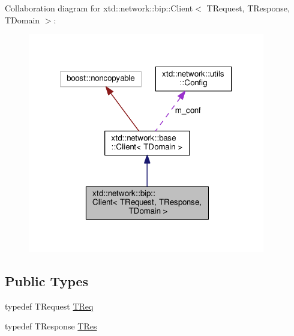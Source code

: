 Collaboration diagram for xtd\-:\-:network\-:\-:bip\-:\-:Client$<$ T\-Request, T\-Response, T\-Domain $>$\-:
\nopagebreak
\begin{figure}[H]
\begin{center}
\leavevmode
\includegraphics[width=293pt]{classxtd_1_1network_1_1bip_1_1Client__coll__graph}
\end{center}
\end{figure}
\subsection*{Public Types}
\begin{DoxyCompactItemize}
\item 
typedef T\-Request \hyperlink{classxtd_1_1network_1_1bip_1_1Client_a4fd207d42e4738c5aa2f6ca947067be4}{T\-Req}
\item 
typedef T\-Response \hyperlink{classxtd_1_1network_1_1bip_1_1Client_a1fc57254a811008a795987c49c222e77}{T\-Res}
\end{DoxyCompactItemize}
